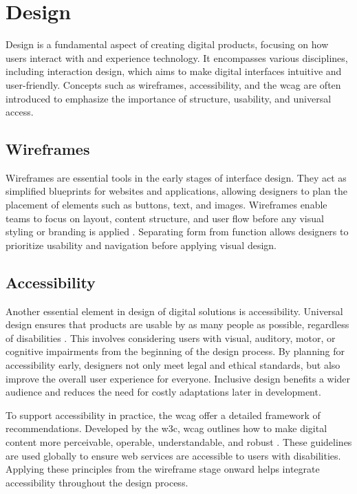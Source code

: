 \newpage

\section{Design}
\label{sec:design}

Design is a fundamental aspect of creating digital products, focusing on how users interact with and experience technology. It encompasses various disciplines, including interaction design, which aims to make digital interfaces intuitive and user-friendly. Concepts such as wireframes, accessibility, and the \gls{wcag} are often introduced to emphasize the importance of structure, usability, and universal access. \\

\subsection{Wireframes}

Wireframes are essential tools in the early stages of interface design. They act as simplified blueprints for websites and applications, allowing designers to plan the placement of elements such as buttons, text, and images. Wireframes enable teams to focus on layout, content structure, and user flow before any visual styling or branding is applied \cite{balsamiq:wireframe}. Separating form from function allows designers to prioritize usability and navigation before applying visual design. \\

\subsection{Accessibility}

Another essential element in design of digital solutions is accessibility. Universal design ensures that products are usable by as many people as possible, regardless of disabilities \cite{uutilsynet:universellutforming}. This involves considering users with visual, auditory, motor, or cognitive impairments from the beginning of the design process. By planning for accessibility early, designers not only meet legal and ethical standards, but also improve the overall user experience for everyone. Inclusive design benefits a wider audience and reduces the need for costly adaptations later in development. \\

\newpage

To support accessibility in practice, the \gls{wcag} offer a detailed framework of recommendations. Developed by the \gls{w3c}, \gls{wcag} outlines how to make digital content more perceivable, operable, understandable, and robust \cite{levelaccess:wcag}. These guidelines are used globally to ensure web services are accessible to users with disabilities. Applying these principles from the wireframe stage onward helps integrate accessibility throughout the design process.

